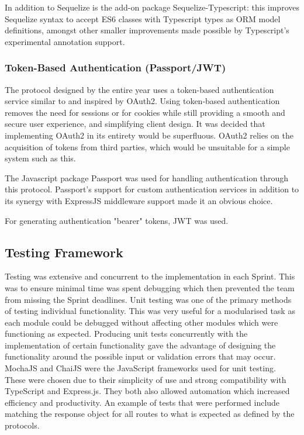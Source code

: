 \documentclass{article}
\begin{document}
In addition to Sequelize is the add-on package Sequelize-Typescript: this improves Sequelize syntax to
accept ES6 classes with Typescript types as ORM model definitions, amongst other smaller improvements
made possible by Typescript's experimental annotation support.

\subsubsection{Token-Based Authentication (Passport/JWT)}
The protocol designed by the entire year uses a token-based authentication service
similar to and inspired by OAuth2. Using token-based authentication removes the need
for sessions or for cookies while still providing a smooth and secure user experience,
and simplifying client design.
It was decided that implementing OAuth2 in its entirety would be superfluous. OAuth2
relies on the acquisition of tokens from third parties, which would be unsuitable for
a simple system such as this.

The Javascript package Passport was used for handling authentication through this protocol.
Passport's support for custom authentication services in addition to its synergy with ExpressJS middleware
support made it an obvious choice.

For generating authentication "bearer" tokens, JWT was used.

\subsection{Testing Framework}
Testing was extensive and concurrent to the implementation in each Sprint. This was to ensure minimal time was spent debugging which then prevented the team from missing the Sprint deadlines. Unit testing was one of the primary methods of testing individual functionality. This was very useful for a modularised task as each module could be debugged without affecting other modules which were functioning as expected. Producing unit tests concurrently with the implementation of certain functionality gave the advantage of designing the functionality around the possible input or validation errors that may occur. MochaJS and ChaiJS were the JavaScript frameworks used for unit testing. These were chosen due to their simplicity of use and strong compatibility with TypeScript and Express.js. They both also allowed automation which increased efficiency and productivity. An example of tests that were performed include matching the response object for all routes to what is expected as defined by the protocols. 
\end{document}
